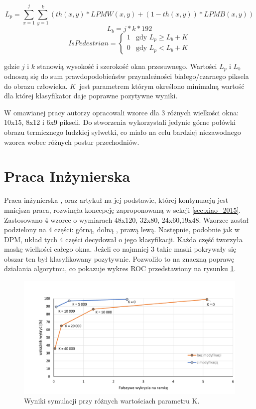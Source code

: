 \begin{equation}\label{equ:Lp}
L_{p} = \sum_{x=1}^{j}\sum_{y=1}^{k}(th(x,y)*LPMW(x,y)+(1-th(x,y))*LPMB(x,y))
\end{equation}
\begin{equation}\label{equ:Lb}
L_{b} = j*k*192
\end{equation}
\begin{equation} \label{equ:ispedistant}
IsPedestrian = \left\{ \begin{array}{ll}
1 & \textrm{gdy $L_{p} \geq L_{b} + K$}\\
0 & \textrm{gdy $L_{p}<L_{b} + K$}
\end{array} \right.
\end{equation}

\noindent gdzie $j$ i $k$ stanowią wysokość i szerokość okna przesuwnego. Wartości $L_p$ i $L_b$ odnoszą się do sum prawdopodobieństw przynależności białego/czarnego piksela do obrazu człowieka. $K$~jest parametrem którym określono minimalną wartość dla której klasyfikator daje poprawne pozytywne wyniki.

W omawianej pracy autorzy opracowali wzorce dla 3 różnych wielkości okna: 10x15, 8x12 i 6x9 pikseli. Do stworzenia wykorzystali jedynie górne połówki obrazu termicznego ludzkiej sylwetki, co miało na celu bardziej niezawodnego wzorca wobec różnych postur przechodniów. 
\section{Praca Inżynierska}
Praca inżynierska \cite{kankaing}, oraz artykuł na jej podstawie\cite{kanka2016fpga}, której kontynuacją jest mniejsza praca, rozwinęła koncepcję zaproponowaną w sekcji \ref{sec:xiao_2015}. Zastosowano 4 wzorce o wymiarach 48x120, 32x80, 24x60,19x48. Wzorzec został podzielony na 4 części: górną, dolną , prawą lewą. Następnie, podobnie jak w DPM, układ tych 4 części decydował o jego klasyfikacji. Każda część tworzyła maskę wielkości całego okna. Jeżeli co najmniej 3 takie maski pokrywały się obszar ten był klasyfikowany pozytywnie. Pozwoliło to na znaczną poprawę działania algorytmu, co pokazuje wykres ROC przedstawiony na rysunku \ref{fig:analiza_wykres}. 

	\begin{figure}
	\centering
	\includegraphics[width=0.8\linewidth]{images/Analiza_wykres}
	\caption[Wykres REC]{Wyniki symulacji przy różnych wartościach parametru K.\cite{kankaing}}
	\label{fig:analiza_wykres}
	\end{figure}

